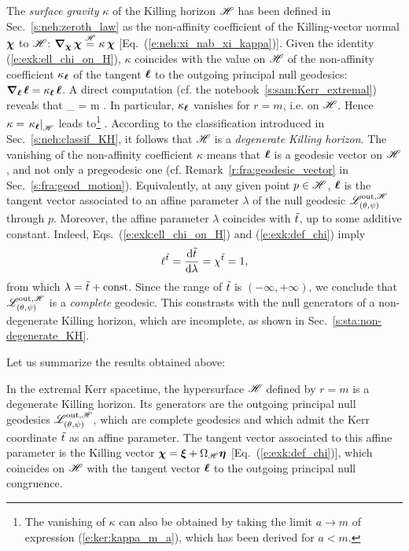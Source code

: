 The \emph{surface gravity} $\kappa$ of the Killing horizon $\mathscr{H}$
has been defined in Sec.~\ref{s:neh:zeroth_law} as the non-affinity coefficient of the Killing-vector normal $\bm{\chi}$ to $\mathscr{H}$:
$\bm{\nabla}_{\bm{\chi}}\, \bm{\chi} \stackrel{\mathscr{H}}{=} \kappa \, \bm{\chi}$ [Eq.~(\ref{e:neh:xi_nab_xi_kappa})].
Given the identity (\ref{e:exk:ell_chi_on_H}), $\kappa$ coincides with the value on $\mathscr{H}$ of the
non-affinity coefficient $\kappa_{\bm{\ell}}$ of the tangent $\bm{\ell}$ to the outgoing principal null
geodesics: $\bm{\nabla}_{\bm{\ell}}\, \bm{\ell} = \kappa_{\bm{\ell}}\, \bm{\ell}$. A direct computation (cf. the notebook~\ref{s:sam:Kerr_extremal}) reveals that
\be
    \kappa_{\wl} = m  .
\ee
In particular, $\kappa_{\bm{\ell}}$ vanishes for $r=m$, i.e. on $\mathscr{H}$.
Hence $\kappa = \left. \kappa_{\bm{\ell}} \right| _{\mathscr{H}}$ leads to\footnote{The vanishing of $\kappa$ can also be obtained
by taking the limit $a\to m$ of expression (\ref{e:ker:kappa_m_a}), which has been derived for $a<m$.}
\be
     .
\ee
According to the classification introduced in Sec.~\ref{s:neh:classif_KH}, it follows
that $\mathscr{H}$ is a \emph{degenerate Killing horizon}.
The vanishing of the non-affinity coefficient $\kappa$ means that $\bm{\ell}$ is a geodesic vector
on $\mathscr{H}$, and not only a pregeodesic  one (cf. Remark~\ref{r:fra:geodesic_vector} in Sec.~\ref{s:fra:geod_motion}). Equivalently, at any given point $p\in\mathscr{H}$,
$\bm{\ell}$ is the tangent vector associated to
an affine parameter $\lambda$ of the null geodesic $\mathscr{L}^{{\rm out},\mathscr{H}}_{(\theta,\psi)}$ through $p$.
Moreover, the affine parameter $\lambda$ coincides with ${\tilde t}$,
up to some additive constant. Indeed,
Eqs.~(\ref{e:exk:ell_chi_on_H}) and (\ref{e:exk:def_chi}) imply
\[
     \ell^{{\tilde t}} = \frac{\mathrm{d} {\tilde t}}{\mathrm{d} \lambda} = \chi^{{\tilde t}} = 1 ,
\]
from which $\lambda = {\tilde t} + \mathrm{const}$.
Since the range of ${\tilde t}$ is $(-\infty, +\infty)$, we conclude that
$\mathscr{L}^{{\rm out},\mathscr{H}}_{(\theta,\psi)}$ is a \emph{complete} geodesic. This constrasts
with the null generators of a non-degenerate Killing horizon, which are
incomplete, as shown in Sec.~\ref{s:sta:non-degenerate_KH}.

Let us summarize the results obtained above:
\begin{prop}
In the extremal Kerr spacetime, the hypersurface $\mathscr{H}$ defined
by $r=m$ is a degenerate Killing horizon.
Its generators are the outgoing principal null geodesics
$\mathscr{L}^{{\rm out},\mathscr{H}}_{(\theta,\psi)}$, which are complete geodesics
and which admit the Kerr coordinate
${\tilde t}$ as an affine parameter. The tangent vector associated to this affine
parameter is the Killing vector $\bm{\chi} = \bm{\xi} + \Omega_{\mathscr{H}} \bm{\eta}$
[Eq.~(\ref{e:exk:def_chi})], which coincides on $\mathscr{H}$ with the tangent
vector $\bm{\ell}$ to the outgoing principal null congruence.
\end{prop}

